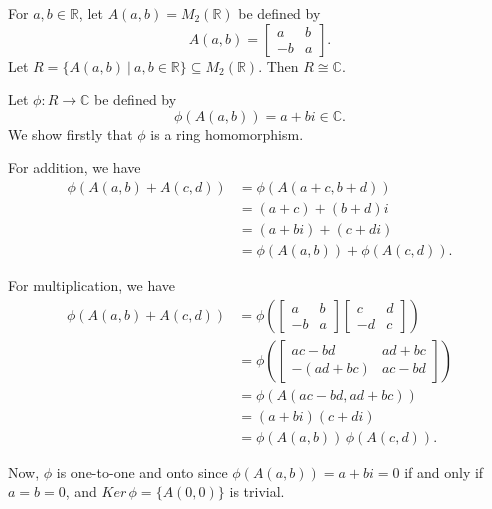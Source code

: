 \begin{example}
    For $a, b \in \mathbb{R}$, let $A(a,b) = M_2(\mathbb{R})$ be defined by 
    \[
        A(a, b) = \begin{bmatrix}
            a & b \\ -b & a 
        \end{bmatrix}.
    \]
    Let $R = \{ A(a,b) \> | \> a, b \in \mathbb{R} \} \subseteq M_2(\mathbb{R})$. Then $R \cong \mathbb{C}$.
\end{example}
\begin{solution}
    Let $\phi: R \to \mathbb{C}$ be defined by 
    \[
        \phi(A(a,b)) = a + bi \in \mathbb{C}.
    \]
    We show firstly that $\phi$ is a ring homomorphism. 

    For addition, we have 
    \begin{align*}
        \phi(A(a,b) + A(c,d)) &= \phi \left( A(a+c, b+ d)\right) \\
        &= (a + c) + (b+d)i\\
        &= (a+bi) + (c + di)\\
        &= \phi\left( A(a,b) \right) + \phi\left( A(c,d) \right).
    \end{align*}

    For multiplication, we have 
    \begin{align*}
        \phi(A(a,b) + A(c,d)) &= \phi \left( \begin{bmatrix}
            a & b \\ -b & a
        \end{bmatrix}
        \begin{bmatrix}
            c & d \\ -d & c
        \end{bmatrix} \right)  \\
        &= \phi \left( \begin{bmatrix}
            ac-bd & ad + bc \\ -(ad+bc) & ac - bd
        \end{bmatrix} \right)\\
        &= \phi \left( A(ac-bd, ad + bc )\right)\\
        &= (a+bi)(c+di)\\
        &= \phi \left( A(a,b)\right)\, \phi \left( A(c,d)\right).
    \end{align*}

    Now, $\phi$ is one-to-one and onto since $\phi \left( A(a,b) \right) = a+bi = 0$ if and only if 
    $a = b = 0$, and $Ker\, \phi =\{ A(0,0) \}$ is trivial.
\end{solution}


